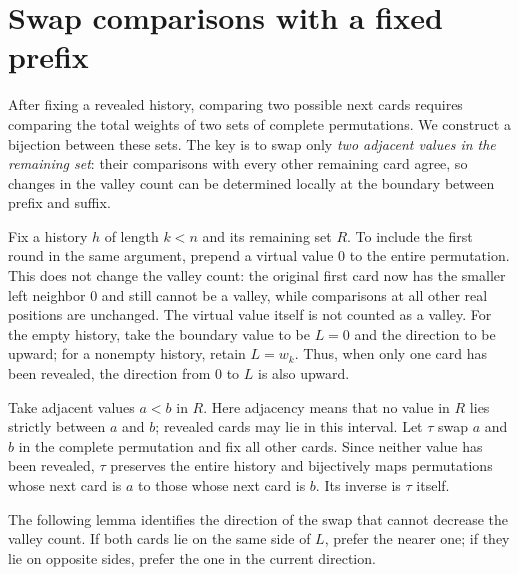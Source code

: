 \documentclass[11pt,reqno]{amsart}
\numberwithin{equation}{section}
\theoremstyle{definition}
\theoremstyle{remark}
\begin{document}
\section{Swap comparisons with a fixed prefix}\label{sec:swap}
After fixing a revealed history, comparing two possible next cards requires comparing the total weights of two sets of complete permutations. We construct a bijection between these sets. The key is to swap only \emph{two adjacent values in the remaining set}: their comparisons with every other remaining card agree, so changes in the valley count can be determined locally at the boundary between prefix and suffix.

Fix a history $h$ of length $k<n$ and its remaining set $R$. To include the first round in the same argument, prepend a virtual value $0$ to the entire permutation. This does not change the valley count: the original first card now has the smaller left neighbor $0$ and still cannot be a valley, while comparisons at all other real positions are unchanged. The virtual value itself is not counted as a valley. For the empty history, take the boundary value to be $L=0$ and the direction to be upward; for a nonempty history, retain $L=w_k$. Thus, when only one card has been revealed, the direction from $0$ to $L$ is also upward.

Take adjacent values $a<b$ in $R$. Here adjacency means that no value in $R$ lies strictly between $a$ and $b$; revealed cards may lie in this interval. Let $\tau$ swap $a$ and $b$ in the complete permutation and fix all other cards. Since neither value has been revealed, $\tau$ preserves the entire history and bijectively maps permutations whose next card is $a$ to those whose next card is $b$. Its inverse is $\tau$ itself.

The following lemma identifies the direction of the swap that cannot decrease the valley count. If both cards lie on the same side of $L$, prefer the nearer one; if they lie on opposite sides, prefer the one in the current direction.
\end{document}
